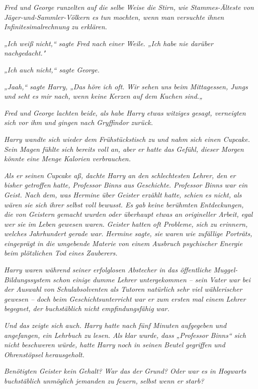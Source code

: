 {\emph{Fred und George runzelten auf die selbe Weise die Stirn, wie Stammes-Älteste von Jäger-und-Sammler-Völkern es tun mochten, wenn man versuchte ihnen Infinitesimalrechnung zu erklären.}

\emph{„Ich weiß nicht,“ sagte Fred nach einer Weile. „Ich habe nie darüber nachgedacht."}

\emph{„Ich auch nicht,“ sagte George.}

\emph{„Jaah,“ sagte Harry, „Das höre ich oft. Wir sehen uns beim Mittagessen, Jungs und seht es mir nach, wenn keine Kerzen auf dem Kuchen sind.„}

\emph{Fred und George lachten beide, als habe Harry etwas witziges gesagt, verneigten sich vor ihm und gingen nach Gryffindor zurück.}

\emph{Harry wandte sich wieder dem Frühstückstisch zu und nahm sich einen Cupcake. Sein Magen fühlte sich bereits voll an, aber er hatte das Gefühl, dieser Morgen könnte eine Menge Kalorien verbrauchen.}

\emph{Als er seinen Cupcake aß, dachte Harry an den schlechtesten Lehrer, den er bisher getroffen hatte, Professor Binns aus Geschichte. Professor Binns war ein Geist. Nach dem, was Hermine über Geister erzählt hatte, schien es nicht, als wären sie sich ihrer selbst voll bewusst. Es gab keine berühmten Entdeckungen, die von Geistern gemacht wurden oder überhaupt etwas an origineller Arbeit, egal wer sie im Leben gewesen waren. Geister hatten oft Probleme, sich zu erinnern, welches Jahrhundert gerade war. Hermine sagte, sie waren wie zufällige Porträts,} \emph{eingeprägt} \emph{in die umgebende Materie von einem Ausbruch psychischer Energie beim plötzlichen Tod eines Zauberers.}

\emph{Harry waren während seiner erfolglosen Abstecher in das öffentliche Muggel-Bildungssystem schon einige dumme Lehrer untergekommen -- sein Vater war bei der Auswahl von Schulabsolventen als Tutoren natürlich sehr viel wählerischer gewesen -- doch beim Geschichtsunterricht war er zum ersten mal einem Lehrer begegnet, der buchstäblich nicht empfindungsfähig war.}

\emph{Und das zeigte sich auch. Harry hatte nach fünf Minuten aufgegeben und angefangen, ein Lehrbuch zu lesen. Als klar wurde, dass „Professor Binns“ sich nicht beschweren würde, hatte Harry noch in seinen Beutel gegriffen und Ohrenstöpsel herausgeholt.}

\emph{Benötigten Geister kein Gehalt? War das der Grund? Oder war es in Hogwarts buchstäblich unmöglich jemanden zu feuern,} \emph{\emph{selbst wenn er starb?}}

}
